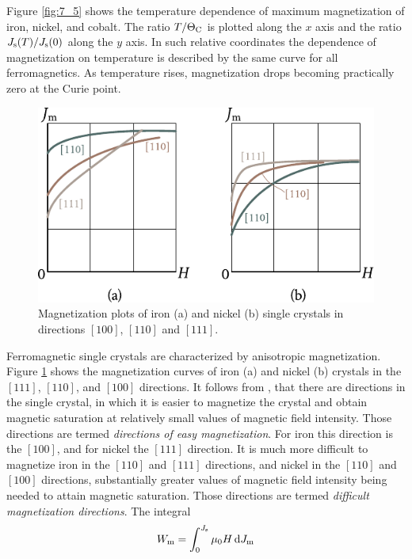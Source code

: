 Figure \ref{fig:7_5} shows the temperature dependence of maximum magnetization of iron, nickel, and cobalt. The ratio $T/\Theta_{\text{C}}$ is plotted along the $x$ axis and the ratio $J_{\text{s}}(T)/J_{\text{s}}(0)$ along the $y$ axis. In such relative coordinates the dependence of magnetization on temperature is described by the same curve for all ferromagnetics. As temperature rises, magnetization drops becoming practically zero at the Curie point.

\begin{figure}[t]
	\begin{center}
		\includegraphics[scale=1]{figures/ch_07/fig_7_6.pdf}
		\caption[]{Magnetization plots of iron (a) and nickel (b) single crystals in directions $[100]$, $[110]$ and $[111]$.}
		\label{fig:7_6}
	\end{center}
	\vspace{-0.7cm}
\end{figure}

Ferromagnetic single crystals are characterized by anisotropic magnetization. Figure \ref{fig:7_6} shows the magnetization curves of iron (a) and nickel (b) crystals in the $[111]$, $[110]$, and $[100]$ directions. It follows from , that there are directions in the single crystal, in which it is easier to magnetize the crystal and obtain magnetic saturation at relatively small values of magnetic field intensity. Those directions are termed \textit{directions of easy magnetization}. For iron this direction is the $[100]$, and for nickel the
$[111]$ direction. It is much more difficult to magnetize iron in the $[110]$ and $[111]$ directions, and nickel in the $[110]$ and $[100]$ directions, substantially greater values of magnetic field intensity being needed to attain magnetic saturation. Those directions are termed \textit{difficult magnetization directions}. The integral
\begin{equation}\label{eq:7_13}
    W_{\text{m}} = \int_0^{J_{\text{s}}} \mu_0 H \, \mathrm{d}J_{\text{m}}
\end{equation}

